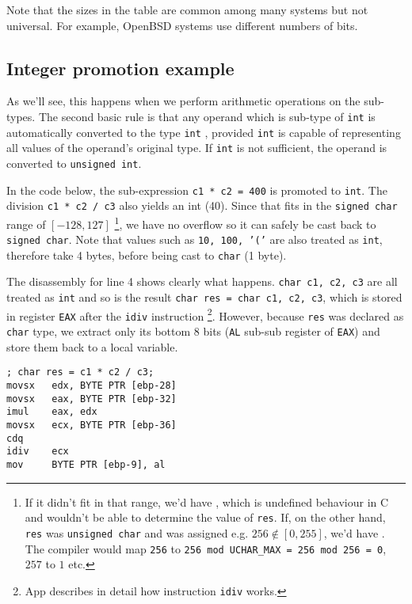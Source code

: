\documentclass[a4paper]{article}
\begin{document}
Note that the sizes in the table are common among many systems but not universal. For example, OpenBSD systems use different numbers of bits.


\subsection{Integer promotion example}

As we'll see, this happens when we perform arithmetic operations on the sub-types. The second basic rule is that any operand which is sub-type of \texttt{int} is automatically converted to the type \texttt{int} , provided \texttt{int}  is capable of representing all values of the operand’s original type. If \texttt{int}  is not sufficient, the operand is converted to \texttt{unsigned int}.

In the code below, the sub-expression \texttt{c1 * c2 = 400} is promoted to \texttt{int}. The division \texttt{c1 * c2 / c3} also yields an int (40). Since that fits in the \texttt{signed char} range of $[-128, 127]$ \footnote{If it didn't fit in that range, we'd have , which is undefined behaviour in C and wouldn't be able to determine the value of \texttt{res}. If, on the other hand, \texttt{res} was \texttt{unsigned char} and was assigned e.g. $256\notin [0,255]$, we'd have . The compiler would map \texttt{256} to \texttt{256 mod UCHAR\_MAX = 256 mod 256 = 0}, $257$ to $1$ etc.}, we have no overflow so it can safely be cast back to \texttt{signed char}. Note that values such as \texttt{10, 100, '('} are also treated as \texttt{int}, therefore take 4 bytes, before being cast to \texttt{char} (1 byte).



The disassembly for line 4 shows clearly what happens. \texttt{char c1, c2, c3} are all treated as \texttt{int} and so is the result \texttt{char res = char c1, c2, c3}, which is stored in register \texttt{EAX} after the \texttt{idiv} instruction \footnote{App \TODO describes in detail how instruction \texttt{idiv} works.}. However, because \texttt{res} was declared as \texttt{char} type, we extract only its bottom 8 bits (\texttt{AL} sub-sub register of \texttt{EAX}) and store them back to a local variable.

\begin{verbatim}
; char res = c1 * c2 / c3;
movsx   edx, BYTE PTR [ebp-28]
movsx   eax, BYTE PTR [ebp-32]
imul    eax, edx
movsx   ecx, BYTE PTR [ebp-36]
cdq
idiv    ecx
mov     BYTE PTR [ebp-9], al
\end{verbatim}
\end{document}
